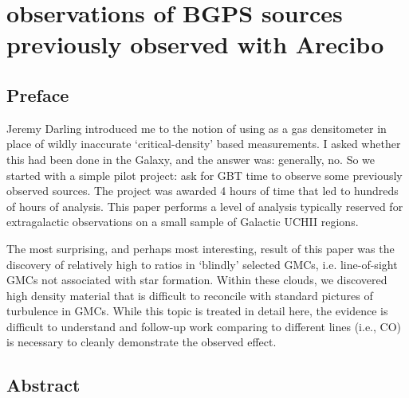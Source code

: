 
%
%

\chapter{\formaldehyde observations of BGPS sources previously observed with Arecibo}
\section{Preface}
Jeremy Darling introduced me to the notion of using \formaldehyde as a gas
densitometer in place of wildly inaccurate `critical-density' based
measurements.  I asked whether this had been done in the Galaxy, and the
answer was: generally, no.  So we started with a simple pilot project:
ask for GBT time to observe some previously observed \formaldehyde sources.
The project was awarded 4 hours of time that led to hundreds of hours of analysis.
This paper performs a level of analysis typically reserved for extragalactic
observations on a small sample of Galactic UCHII regions.

The most surprising, and perhaps most interesting, result of this paper was the
discovery of relatively high \formaldehyde \twotwo to \oneone ratios in
`blindly' selected GMCs, i.e.  line-of-sight GMCs not associated with star
formation.  Within these clouds, we discovered high density material that is
difficult to reconcile with standard pictures of turbulence in GMCs.  While
this topic is treated in detail here, the evidence is difficult to understand
and follow-up work comparing to different lines (i.e., CO) is necessary to
cleanly demonstrate the observed effect.

\section{Abstract}

